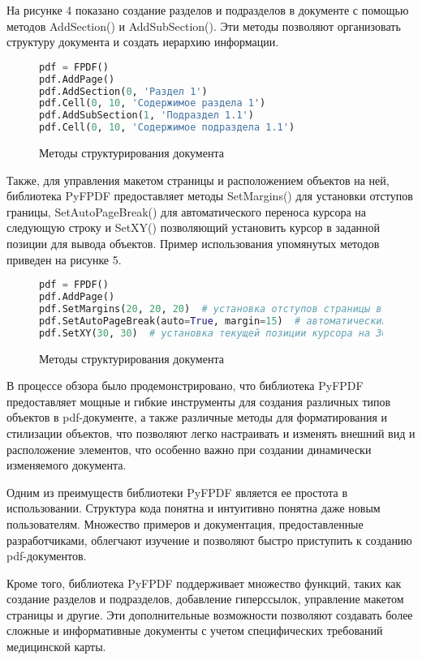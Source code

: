 На рисунке 4 показано создание разделов и подразделов в документе с помощью методов AddSection() и AddSubSection(). Эти методы позволяют организовать структуру документа и создать иерархию информации.

\begin{figure}
\begin{lstlisting}[language=Python]
pdf = FPDF()
pdf.AddPage()
pdf.AddSection(0, 'Раздел 1')
pdf.Cell(0, 10, 'Содержимое раздела 1')
pdf.AddSubSection(1, 'Подраздел 1.1')
pdf.Cell(0, 10, 'Содержимое подраздела 1.1')
\end{lstlisting}
\caption{Методы структурирования документа}
\label{src:src4}
\end{figure} 

Также, для управления макетом страницы и расположением объектов на ней, библиотека PyFPDF предоставляет методы SetMargins() для установки отступов границы, SetAutoPageBreak() для автоматического переноса курсора на следующую строку и SetXY() позволяющий установить курсор в заданной позиции для вывода объектов. Пример использования упомянутых методов приведен на рисунке 5.

\begin{figure}
\begin{lstlisting}[language=Python]
pdf = FPDF()
pdf.AddPage()
pdf.SetMargins(20, 20, 20)  # установка отступов страницы в 20 мм со всех сторон
pdf.SetAutoPageBreak(auto=True, margin=15)  # автоматический перенос на новую страницу
pdf.SetXY(30, 30)  # установка текущей позиции курсора на 30;30
\end{lstlisting}
\caption{Методы структурирования документа}
\label{src:src5}
\end{figure} 

В процессе обзора было продемонстрировано, что библиотека PyFPDF предоставляет мощные и гибкие инструменты для создания различных типов объектов в pdf-документе, а также различные методы для форматирования и стилизации объектов, что позволяют легко настраивать и изменять внешний вид и расположение элементов, что особенно важно при создании динамически изменяемого документа.

Одним из преимуществ библиотеки PyFPDF является ее простота в использовании. Структура кода понятна и интуитивно понятна даже новым пользователям. Множество примеров и документация, предоставленные разработчиками, облегчают изучение и позволяют быстро приступить к созданию pdf-документов.

Кроме того, библиотека PyFPDF поддерживает множество функций, таких как создание разделов и подразделов, добавление гиперссылок, управление макетом страницы и другие. Эти дополнительные возможности позволяют создавать более сложные и информативные документы с учетом специфических требований медицинской карты.

